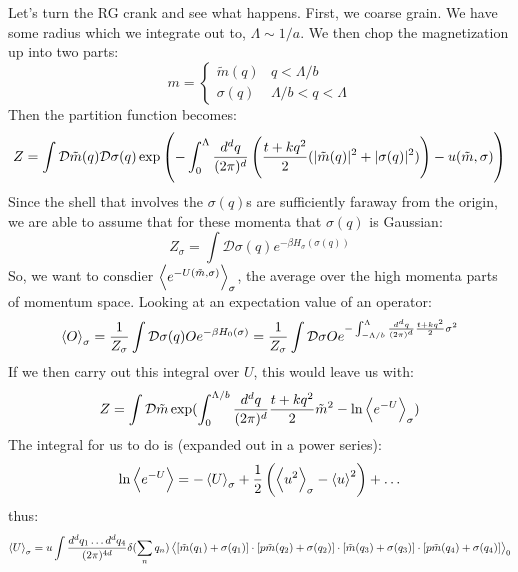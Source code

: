 Let's turn the RG crank and see what happens. First, we coarse grain. We have some radius which we integrate out to, $\Lambda \sim 1/a$. We then chop the magnetization up into two parts:
\begin{equation}
    m = \begin{cases}
        \tilde{m}(q) & q < \Lambda/b 
        \\ \sigma(q) & \Lambda/b < q < \Lambda
    \end{cases}
\end{equation}
Then the partition function becomes:
\begin{equation}
    Z = \int \mathcal{D}\tilde{m}(q)\mathcal{D}\sigma(q) \exp\left(-\int_0^\Lambda \frac{d^dq}{(2\pi)^d}\left(\frac{t + kq^2}{2}(\lvert \tilde{m}(q) \rvert^2 + \lvert \sigma(q) \rvert^2)\right) - u(\tilde{m}, \sigma)\right)
\end{equation}
Since the shell that involves the $\sigma(q)$s are sufficiently faraway from the origin, we are able to assume that for these momenta that $\sigma(q)$ is Gaussian:
\begin{equation}
    Z_\sigma = \int \mathcal{D}\sigma(q)e^{-\beta H_\sigma(\sigma(q))}
\end{equation}
So, we want to consdier $\left< e^{-U(\tilde{m}, \sigma)} \right>_\sigma$, the average over the high momenta parts of momentum space. Looking at an expectation value of an operator:
\begin{equation}
    \left< O \right>_\sigma = \frac{1}{Z_\sigma}\int \mathcal{D}\sigma(q) O e^{-\beta H_0(\sigma)} = \frac{1}{Z_\sigma}\int \mathcal{D}\sigma O e^{-\int_{-\Lambda/b}^{\Lambda} \frac{d^dq}{(2\pi)^d} \frac{t + kq^2}{2}\sigma^2}
\end{equation}
If we then carry out this integral over $U$, this would leave us with:
\begin{equation}
    Z = \int \mathcal{D}\tilde{m}\exp(\int_0^{\Lambda/b} \frac{d^dq}{(2\pi)^d} \frac{t + kq^2}{2}\tilde{m}^2 - \ln\left< e^{-U} \right>_\sigma)
\end{equation}
The integral for us to do is (expanded out in a power series):
\begin{equation}
    \ln \left< e^{-U} \right> = -\left< U \right>_\sigma + \frac{1}{2}\left(\left< u^2 \right>_\sigma - \left< u \right>^2\right) + \ldots
\end{equation}
thus:
\begin{equation}
    \left< U \right>_\sigma = u\int \frac{d^dq_1 \ldots d^dq_4}{(2\pi)^{4d}}\delta(\sum_n q_n) \left< [\tilde{m}(q_1) + \sigma(q_1)] \cdot [p\tilde{m}(q_2) + \sigma(q_2)] \cdot [\tilde{m}(q_3) + \sigma(q_3)] \cdot [p\tilde{m}(q_4) + \sigma(q_4)] \right>_0
\end{equation}
